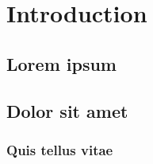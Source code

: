 \chapter{Introduction}

\section{Lorem ipsum}


\section{Dolor sit amet}


\subsection{Quis tellus vitae}

